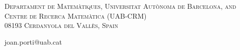 \documentclass[a4paper,11pt]{article}
\newtheorem{Remark}[Theorem]{Remark}
\begin{document}
 
 
 







% 




  












\begin{small}
\noindent \textsc{Departament de Matem\`atiques,  Universitat Aut\`onoma de Barcelona,
and Centre de Recerca Matem\`atica (UAB-CRM)\\
08193 Cerdanyola del Vall\`es, Spain }

\noindent \textsf{joan.porti@uab.cat}
\end{small}
\end{document}
